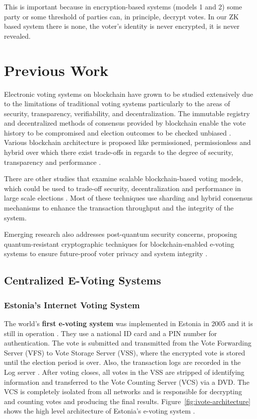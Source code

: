 \documentclass[12pt, a4paper]{report}
\begin{document}
This is important because in encryption-based systems (models 1 and 2) some party or some threshold of parties can, in principle, decrypt votes. In our ZK based system there is none, the voter's identity is never encrypted, it is never revealed.

\newpage
\section{Previous Work}

Electronic voting systems on blockchain have grown to be studied extensively due to the limitations of traditional voting systems particularly to the areas of security, transparency, verifiability, and decentralization. The immutable registry and decentralized methods of consensus provided by blockchain enable the vote history to be compromised and election outcomes to be checked unbiased \cite{mdpi2024evoting, hajian2024blockchain, cluster2024blockchain}. Various blockchain architecture is proposed like permissioned, permissionless and hybrid over which there exist trade-offs in regards to the degree of security, transparency and performance \cite{kho2022review}.

There are other studies that examine scalable blockchain-based voting models, which could be used to trade-off security, decentralization and performance in large scale elections \cite{mdpi2022scalability, abuidris2021secure}. Most of these techniques use sharding and hybrid consensus mechanisms to enhance the transaction throughput and the integrity of the system.

Emerging research also addresses post-quantum security concerns, proposing quantum-resistant cryptographic techniques for blockchain-enabled e-voting systems to ensure future-proof voter privacy and system integrity \cite{arxiv2024quantum, mandal2024hybrid, alshahrani2021endtoend}.

\subsection{Centralized E-Voting Systems}

\subsubsection{Estonia's Internet Voting System}
The world's \textbf{first e-voting system} was implemented in Estonia in 2005 and it is still in operation \cite{madise2005evoting}. They use a national ID card and a PIN number for authentication. The vote is submitted and transmitted from the Vote Forwarding Server (VFS) to Vote Storage Server (VSS), where the encrypted vote is stored until the election period is over. Also, the transaction logs are recorded in the Log server \cite{ivoting-ccs2014}. After voting closes, all votes in the VSS are stripped of identifying information and transferred to the Vote Counting Server (VCS) via a DVD. The VCS is completely isolated from all networks and is responsible for decrypting and counting votes and producing the final results. Figure~\ref{fig:ivote-architecture} shows the high level architecture of Estonia's e-voting system \cite{ivxv_protocols2022}.
\end{document}
